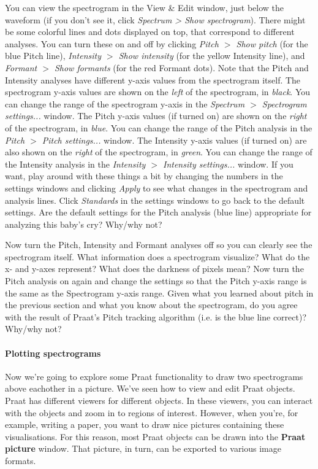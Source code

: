 \documentclass[a4paper, 9pt]{article}
\begin{document}
\begin{exercise}
\action You can view the spectrogram in
the View \& Edit window, just below the waveform (if you don't see it, click \emph{Spectrum > Show spectrogram}). There might be some colorful lines and dots displayed on top, that correspond to different analyses. You can turn these on and off by clicking \emph{Pitch $>$ Show pitch} (for the blue Pitch line), \emph{Intensity $>$ Show intensity} (for the yellow Intensity line), and \emph{Formant $>$ Show formants} (for the red Formant dots). 
\action Note that the Pitch and Intensity analyses have different y-axis values from the spectrogram itself. The spectrogram y-axis values are shown on the \emph{left} of the spectrogram, in \emph{black}. You can change the range of the spectrogram y-axis in the \emph{Spectrum $>$ Spectrogram settings...} window. The Pitch y-axis values (if turned on) are shown on the \emph{right} of the spectrogram, in \emph{blue}. You can change the range of the Pitch analysis in the \emph{Pitch $>$ Pitch settings...} window. The Intensity y-axis values (if turned on) are also shown on the \emph{right} of the spectrogram, in \emph{green}. You can change the range of the Intensity analysis in the \emph{Intensity $>$ Intensity settings...} window. If you want, play around with these things a bit by changing the numbers in the settings windows and clicking \emph{Apply} to see what changes in the spectrogram and analysis lines. Click \emph{Standards} in the settings windows to go back to the default settings.
\action Are the default settings for the Pitch analysis (blue line) appropriate for analyzing this baby's cry? Why/why not?
\end{exercise}
\begin{exercise}
\action Now turn the Pitch, Intensity and Formant analyses off so you can clearly see the spectrogram itself.
\askstar What information does a spectrogram visualize? What do the x- and y-axes represent? What does the darkness of pixels mean?
\action Now turn the Pitch analysis on again and change the settings so that the Pitch y-axis range is the same as the Spectrogram y-axis range. Given what you learned about pitch in the previous section and what you know about the spectrogram, do you agree with the result of Praat's Pitch tracking algorithm (i.e. is the blue line correct)? Why/why not?
\end{exercise}

\paragraph{Plotting spectrograms} Now we're going to explore some Praat functionality to draw two spectrograms above eachother in a picture. We've seen how to view and edit Praat objects. Praat has different viewers for different objects. In these viewers, you can interact with the objects and zoom in to regions of interest. However, when you're, for example, writing a paper, you want to draw nice pictures containing these visualisations. For this reason, most Praat objects can be drawn into the \textbf{Praat picture} window. That picture, in turn, can be exported to various image formats.
\end{document}
